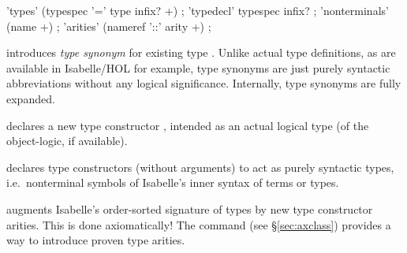 \begin{isabellebody}
\begin{isamarkuptext}
  \begin{rail}
    'types' (typespec '=' type infix? +)
    ;
    'typedecl' typespec infix?
    ;
    'nonterminals' (name +)
    ;
    'arities' (nameref '::' arity +)
    ;
  \end{rail}

  \begin{descr}

  \item [\isa{\isacommand{types}}~\isa{{\isacharparenleft}{\isasymalpha}\isactrlsub {\isadigit{1}}{\isacharcomma}\ {\isasymdots}{\isacharcomma}\ {\isasymalpha}\isactrlsub n{\isacharparenright}\ t\ {\isacharequal}\ {\isasymtau}}]
  introduces \emph{type synonym} 
  for existing type \isa{{\isasymtau}}.  Unlike actual type definitions, as
  are available in Isabelle/HOL for example, type synonyms are just
  purely syntactic abbreviations without any logical significance.
  Internally, type synonyms are fully expanded.
  
  \item [\isa{\isacommand{typedecl}}~\isa{{\isacharparenleft}{\isasymalpha}\isactrlsub {\isadigit{1}}{\isacharcomma}\ {\isasymdots}{\isacharcomma}\ {\isasymalpha}\isactrlsub n{\isacharparenright}\ t}]
  declares a new type constructor , intended as an actual
  logical type (of the object-logic, if available).

  \item [\isa{\isacommand{nonterminals}}~\isa{c}] declares type
  constructors  (without arguments) to act as purely
  syntactic types, i.e.\ nonterminal symbols of Isabelle's inner
  syntax of terms or types.

  \item [\isa{\isacommand{arities}}~\isa{t\ {\isacharcolon}{\isacharcolon}\ {\isacharparenleft}s\isactrlsub {\isadigit{1}}{\isacharcomma}\ {\isasymdots}{\isacharcomma}\ s\isactrlsub n{\isacharparenright}\ s}] augments Isabelle's order-sorted signature of types by new type
  constructor arities.  This is done axiomatically!  The  command (see \S\ref{sec:axclass}) provides a way to
  introduce proven type arities.


\end{descr}
\end{isamarkuptext}
\end{isabellebody}
